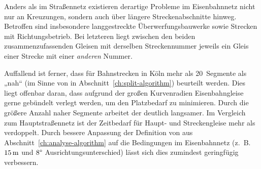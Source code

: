 \documentclass[../main/thesis.tex]{subfiles}
\begin{document}

Anders als im Straßennetz existieren derartige Probleme im Eisenbahnnetz nicht nur an Kreuzungen, sondern auch über längere Streckenabschnitte hinweg.
Betroffen sind insbesondere langgestreckte Überwerfungsbauwerke sowie Strecken mit Richtungsbetrieb.
Bei letzteren liegt zwischen den beiden zusammenzufassenden Gleisen mit derselben Streckennummer jeweils ein Gleis einer Strecke mit einer \emph{anderen} Nummer. 

Auffallend ist ferner, dass für Bahnstrecken in Köln mehr als 20~Segmente als „nah“ (im Sinne von  in Abschnitt~\ref{ch:split-algorithm}) beurteilt werden.
Dies liegt offenbar daran, dass aufgrund der großen Kurvenradien Eisenbahngleise gerne gebündelt verlegt werden, um den Platzbedarf zu minimieren.
Durch die größere Anzahl naher Segmente arbeitet der  deutlich langsamer.
Im Vergleich zum Hauptstraßennetz ist der Zeitbedarf für Haupt- und Streckengleise mehr als verdoppelt.
Durch bessere Anpassung der Definition von  aus Abschnitt~\ref{ch:analyse-algorithm} auf die Bedingungen im Eisenbahnnetz (z.~B. $\unit[15]{m}$  und $8\degree$ Ausrichtungsunterschied) lässt sich dies zumindest geringfügig verbessern.






\end{document}
